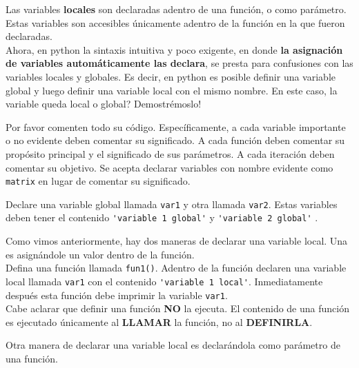 \documentclass[11pt,letterpaper]{exam}
\begin{document}
Las variables \textbf{locales} son declaradas adentro de una funci\'on, o como par\'ametro. Estas variables son accesibles \'unicamente adentro de la funci\'on en la que fueron declaradas.\\

Ahora, en python la sintaxis intuitiva y poco exigente, en donde \textbf{la asignaci\'on de variables autom\'aticamente las declara}, se presta para confusiones con las variables locales y globales. Es decir, en python es posible definir una variable global y luego definir una variable local con el mismo nombre. En este caso, la variable queda local o global? Demostr\'emoslo!\\

\begin{questions}


Por favor comenten todo su c\'odigo. Espec\'ificamente, a cada variable importante o no evidente deben comentar su significado. A cada funci\'on deben comentar su prop\'osito principal y el significado de sus par\'ametros. A cada iteraci\'on deben comentar su objetivo. Se acepta declarar variables con nombre evidente como \verb"matrix" en lugar de comentar su significado.


Declare una variable global llamada \verb"var1" y otra llamada \verb"var2". Estas variables deben tener el contenido \verb"'variable 1 global'" y \verb"'variable 2 global'" .


Como vimos anteriormente, hay dos maneras de declarar una variable local. Una es asign\'andole un valor dentro de la funci\'on. \\

Defina una funci\'on llamada \verb"fun1()". Adentro de la funci\'on declaren una variable local llamada \verb"var1" con el contenido \verb"'variable 1 local'". Inmediatamente despu\'es esta funci\'on debe imprimir la variable \verb"var1".\\

Cabe aclarar que definir una funci\'on \textbf{NO} la ejecuta. El contenido de una funci\'on es ejecutado \'unicamente al \textbf{LLAMAR} la funci\'on, no al \textbf{DEFINIRLA}.


Otra manera de declarar una variable local es declar\'andola como par\'ametro de una funci\'on. \\


\end{questions}
\end{document}

